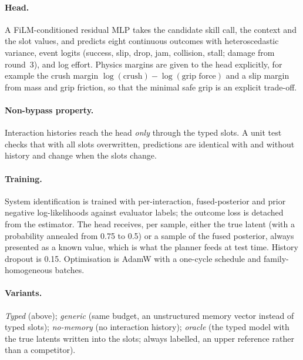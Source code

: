 \paragraph{Head.} A FiLM-conditioned residual MLP \citep{perez2018film} takes the candidate skill call, the
context and the slot values, and predicts eight continuous outcomes with heteroscedastic variance, event logits
(success, slip, drop, jam, collision, stall; damage from round~3), and log effort. Physics margins are given
to the head explicitly, for example the crush margin $\log(\text{crush}) - \log(\text{grip force})$ and a
slip margin from mass and grip friction, so that the minimal safe grip is an explicit trade-off.

\paragraph{Non-bypass property.} Interaction histories reach the head \emph{only} through the typed slots. A
unit test checks that with all slots overwritten, predictions are identical with and without history and change
when the slots change.

\paragraph{Training.} System identification is trained with per-interaction, fused-posterior and prior negative
log-likelihoods against evaluator labels; the outcome loss is detached from the estimator. The head receives,
per sample, either the true latent (with a probability annealed from 0.75 to 0.5) or a sample of the fused
posterior, always presented as a known value, which is what the planner feeds at test time. History dropout is
0.15. Optimisation is AdamW \citep{loshchilov2019adamw} with a one-cycle schedule and family-homogeneous batches.

\paragraph{Variants.} \emph{Typed} (above); \emph{generic} (same budget, an unstructured memory vector instead
of typed slots); \emph{no-memory} (no interaction history); \emph{oracle} (the typed model with the true
latents written into the slots; always labelled, an upper reference rather than a competitor).

